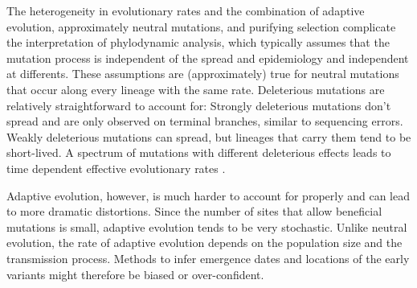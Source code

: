 \documentclass[aps,rmp, twocolumn]{revtex4}
\begin{document}
The heterogeneity in evolutionary rates and the combination of adaptive evolution, approximately neutral mutations, and purifying selection complicate the interpretation of phylodynamic analysis, which typically assumes that the mutation process is independent of the spread and epidemiology and independent at differents.
These assumptions are (approximately) true for neutral mutations that occur along every lineage with the same rate.
Deleterious mutations are relatively straightforward to account for: Strongly deleterious mutations don't spread and are only observed on terminal branches, similar to sequencing errors.
Weakly deleterious mutations can spread, but lineages that carry them tend to be short-lived.
A spectrum of mutations with different deleterious effects leads to time dependent effective evolutionary rates \citep{wertheim_purifying_2011}.

Adaptive evolution, however, is much harder to account for properly and can lead to more dramatic distortions.
Since the number of sites that allow beneficial mutations is small, adaptive evolution tends to be very stochastic.
Unlike neutral evolution, the rate of adaptive evolution depends on the population size and the transmission process.
Methods to infer emergence dates and locations of the early variants might therefore be biased or over-confident.



\appendix

\onecolumngrid

% 
\end{document}
